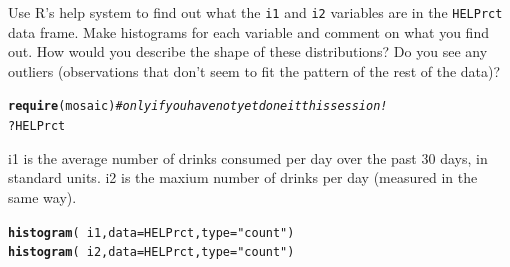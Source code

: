 \documentclass[twoside]{book}\usepackage[]{graphicx}\usepackage[]{xcolor}
\makeatletter
\newcommand{\hlstr}[1]{\textcolor[rgb]{0.192,0.494,0.8}{#1}}%
\newcommand{\hlcom}[1]{\textcolor[rgb]{0.678,0.584,0.686}{\textit{#1}}}%
\newcommand{\hlopt}[1]{\textcolor[rgb]{0,0,0}{#1}}%
\newcommand{\hlstd}[1]{\textcolor[rgb]{0.345,0.345,0.345}{#1}}%
\newcommand{\hlkwc}[1]{\textcolor[rgb]{0.333,0.667,0.333}{#1}}%
\newcommand{\hlkwd}[1]{\textcolor[rgb]{0.737,0.353,0.396}{\textbf{#1}}}%
\newenvironment{kframe}{%
 \def\at@end@of@kframe{}%
 \ifinner\ifhmode%
  \def\at@end@of@kframe{\end{minipage}}%
  \begin{minipage}{\columnwidth}%
 \fi\fi%
 \def\FrameCommand##1{\hskip\@totalleftmargin \hskip-\fboxsep
 \colorbox{shadecolor}{##1}\hskip-\fboxsep
     \hskip-\linewidth \hskip-\@totalleftmargin \hskip\columnwidth}%
 \MakeFramed {\advance\hsize-\width
   \@totalleftmargin\z@ \linewidth\hsize
   \@setminipage}}%
 {\par\unskip\endMakeFramed%
 \at@end@of@kframe}
\newenvironment{knitrout}{}{} %
\newcommand{\variable}[1]{{\color{green!50!black}\texttt{#1}}}
\newcommand{\Rindex}[1]{\index{\texttt{#1}}}
\newcommand{\dataframe}[1]{{\color{blue!80!black}\texttt{#1}}\Rindex{#1}}
\def\R{{\sf R}}
\makeatother
\begin{document}
\begin{problem}
	Use \R's help system to find out what the \variable{i1} and \variable{i2}
	variables are in the \dataframe{HELPrct} data frame.  Make histograms
	for each variable and comment on what you find out.  How would you describe
	the shape of these distributions?  Do you see any outliers (observations
	that don't seem to fit the pattern of the rest of the data)?  
\end{problem}

\begin{solution}
\begin{knitrout}
\color{fgcolor}\begin{kframe}
\begin{alltt}
\hlkwd{require}\hlstd{(mosaic)} \hlcom{#only if you have not yet done it this session!}
\hlopt{?}\hlstd{HELPrct}
\end{alltt}
\end{kframe}
\end{knitrout}
i1 is the average number of drinks consumed per day over the past 30 days, in standard units.  i2 is the maxium number of drinks per day (measured in the same way).  

\begin{knitrout}
\color{fgcolor}\begin{kframe}
\begin{alltt}
\hlkwd{histogram}\hlstd{(}\hlopt{~} \hlstd{i1,} \hlkwc{data}\hlstd{=HELPrct,} \hlkwc{type}\hlstd{=}\hlstr{"count"}\hlstd{)}
\hlkwd{histogram}\hlstd{(}\hlopt{~} \hlstd{i2,} \hlkwc{data}\hlstd{=HELPrct,} \hlkwc{type}\hlstd{=}\hlstr{"count"}\hlstd{)}
\end{alltt}
\end{kframe}


\end{knitrout}
\end{solution}
\end{document}
